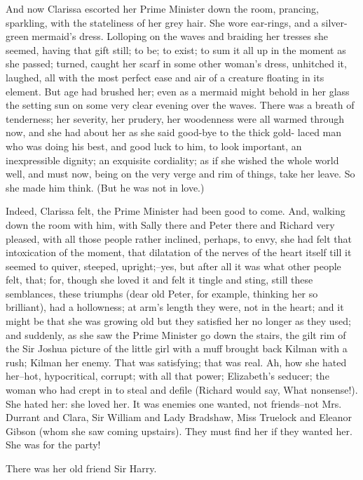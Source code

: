 \documentclass[lang=cn,10pt]{elegantbook}
\begin{document}
And now Clarissa escorted her Prime Minister down the room,
prancing, sparkling, with the stateliness of her grey hair.  She
wore ear-rings, and a silver-green mermaid's dress.  Lolloping on
the waves and braiding her tresses she seemed, having that gift
still; to be; to exist; to sum it all up in the moment as she
passed; turned, caught her scarf in some other woman's dress,
unhitched it, laughed, all with the most perfect ease and air of a
creature floating in its element.  But age had brushed her; even as
a mermaid might behold in her glass the setting sun on some very
clear evening over the waves.  There was a breath of tenderness;
her severity, her prudery, her woodenness were all warmed through
now, and she had about her as she said good-bye to the thick gold-
laced man who was doing his best, and good luck to him, to look
important, an inexpressible dignity; an exquisite cordiality; as if
she wished the whole world well, and must now, being on the very
verge and rim of things, take her leave.  So she made him think.
(But he was not in love.)

Indeed, Clarissa felt, the Prime Minister had been good to come.
And, walking down the room with him, with Sally there and Peter
there and Richard very pleased, with all those people rather
inclined, perhaps, to envy, she had felt that intoxication of the
moment, that dilatation of the nerves of the heart itself till it
seemed to quiver, steeped, upright;--yes, but after all it was what
other people felt, that; for, though she loved it and felt it
tingle and sting, still these semblances, these triumphs (dear old
Peter, for example, thinking her so brilliant), had a hollowness;
at arm's length they were, not in the heart; and it might be that
she was growing old but they satisfied her no longer as they used;
and suddenly, as she saw the Prime Minister go down the stairs, the
gilt rim of the Sir Joshua picture of the little girl with a muff
brought back Kilman with a rush; Kilman her enemy.  That was
satisfying; that was real.  Ah, how she hated her--hot,
hypocritical, corrupt; with all that power; Elizabeth's seducer;
the woman who had crept in to steal and defile (Richard would say,
What nonsense!).  She hated her: she loved her.  It was enemies one
wanted, not friends--not Mrs. Durrant and Clara, Sir William and
Lady Bradshaw, Miss Truelock and Eleanor Gibson (whom she saw
coming upstairs).  They must find her if they wanted her.  She was
for the party!

There was her old friend Sir Harry.
\end{document}
